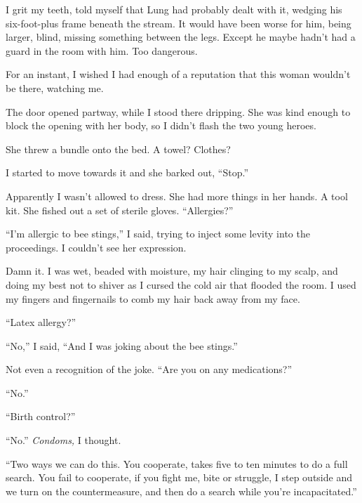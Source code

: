 I grit my teeth, told myself that Lung had probably dealt with it, wedging his six-foot-plus frame beneath the stream.  It would have been worse for him, being larger, blind, missing something between the legs.  Except he maybe hadn't had a guard in the room with him.  Too dangerous.



For an instant, I wished I had enough of a reputation that this woman wouldn't be there, watching me.



The door opened partway, while I stood there dripping.  She was kind enough to block the opening with her body, so I didn't flash the two young heroes.



She threw a bundle onto the bed.  A towel?  Clothes?



I started to move towards it and she barked out, ``Stop.''



Apparently I wasn't allowed to dress.  She had more things in her hands.  A tool kit.  She fished out a set of sterile gloves.  ``Allergies?''



``I'm allergic to bee stings,'' I said, trying to inject some levity into the proceedings. I couldn't see her expression.



Damn it.  I was wet, beaded with moisture, my hair clinging to my scalp, and doing my best not to shiver as I cursed the cold air that flooded the room.  I used my fingers and fingernails to comb my hair back away from my face.



``Latex allergy?''



``No,'' I said, ``And I was joking about the bee stings.''



Not even a recognition of the joke.  ``Are you on any medications?''



``No.''



``Birth control?''



``No.''  \emph{Condoms, }I thought.



``Two ways we can do this.  You cooperate, takes five to ten minutes to do a full search.  You fail to cooperate, if you fight me, bite or struggle, I step outside and we turn on the countermeasure, and then do a search while you're incapacitated.''



